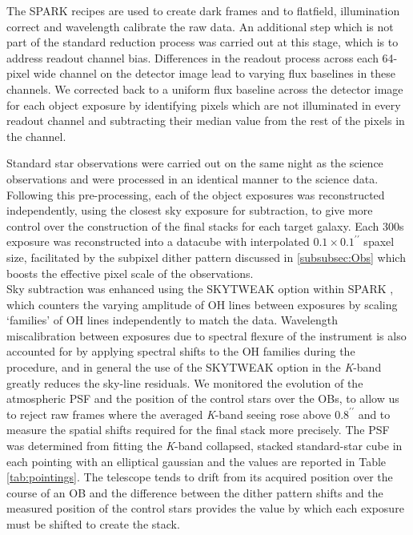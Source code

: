 \documentclass[fleqn,usenatbib]{mn2e}
\begin{document}
The SPARK recipes are used to create dark frames and to flatfield, illumination correct and wavelength calibrate the raw data.
An additional step which is not part of the standard reduction process was carried out at this stage, which is to address readout channel bias.
Differences in the readout process across each 64-pixel wide channel on the detector image lead to varying flux baselines in these channels.
We corrected back to a uniform flux baseline across the detector image for each object exposure by identifying pixels which are not illuminated in every readout channel and subtracting their median value from the rest of the pixels in the channel.

Standard star observations were carried out on the same night as the science observations and were processed in an identical manner to the science data.
Following this pre-processing, each of the object exposures was reconstructed independently, using the closest sky exposure for subtraction, to give more control over the construction of the final stacks for each target galaxy.
Each 300s exposure was reconstructed into a datacube with interpolated $0.1\times0.1^{\prime\prime}$ spaxel size, facilitated by the subpixel dither pattern discussed in \cref{subsubsec:Obs} which boosts the effective pixel scale of the observations. \\

Sky subtraction was enhanced using the SKYTWEAK option within SPARK \citep{Davies2007}, which counters the varying amplitude of OH lines between exposures by scaling `families' of OH lines independently to match the data.
Wavelength miscalibration between exposures due to spectral flexure of the instrument is also accounted for by applying spectral shifts to the OH families during the procedure, and in general the use of the SKYTWEAK option in the {\it K}-band greatly reduces the sky-line residuals. 
We monitored the evolution of the atmospheric PSF and the position of the control stars over the OBs, to allow us to reject raw frames where the averaged {\it K}-band seeing rose above $0.8^{\prime\prime}$ and to measure the spatial shifts required for the final stack more precisely.
The PSF was determined from fitting the {\it K}-band collapsed, stacked standard-star cube in each pointing with an elliptical gaussian and the values are reported in Table \ref{tab:pointings}.
The telescope tends to drift from its acquired position over the course of an OB and the difference between the dither pattern shifts and the measured position of the control stars provides the value by which each exposure must be shifted to create the stack. \\
\end{document}
